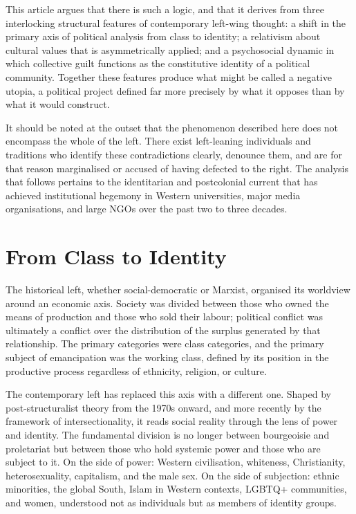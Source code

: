 \documentclass[12pt,a4paper]{article}
\begin{document}
	This article argues that there is such a logic, and that it derives from three
	interlocking structural features of contemporary left-wing thought: a shift in the
	primary axis of political analysis from class to identity; a relativism about
	cultural values that is asymmetrically applied; and a psychosocial dynamic in which
	collective guilt functions as the constitutive identity of a political community.
	Together these features produce what might be called a negative utopia, a political
	project defined far more precisely by what it opposes than by what it would
	construct.
	
	It should be noted at the outset that the phenomenon described here does not
	encompass the whole of the left. There exist left-leaning individuals and traditions
	who identify these contradictions clearly, denounce them, and are for that reason
	marginalised or accused of having defected to the right. The analysis that follows
	pertains to the identitarian and postcolonial current that has achieved institutional
	hegemony in Western universities, major media organisations, and large NGOs over the
	past two to three decades.
	
	\section{From Class to Identity}
	
	The historical left, whether social-democratic or Marxist, organised its worldview
	around an economic axis. Society was divided between those who owned the means of
	production and those who sold their labour; political conflict was ultimately a
	conflict over the distribution of the surplus generated by that relationship. The
	primary categories were class categories, and the primary subject of emancipation
	was the working class, defined by its position in the productive process regardless
	of ethnicity, religion, or culture.
	
	The contemporary left has replaced this axis with a different one. Shaped by
	post-structuralist theory from the 1970s onward, and more recently by the framework
	of intersectionality, it reads social reality through the lens of power and
	identity. The fundamental division is no longer between bourgeoisie and proletariat
	but between those who hold systemic power and those who are subject to it. On the
	side of power: Western civilisation, whiteness, Christianity, heterosexuality,
	capitalism, and the male sex. On the side of subjection: ethnic minorities, the
	global South, Islam in Western contexts, LGBTQ+ communities, and women, understood
	not as individuals but as members of identity groups.
	
\end{document}
